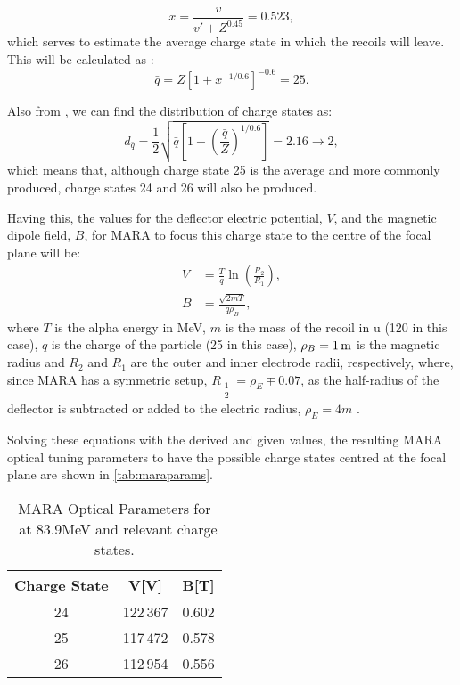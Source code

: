 \begin{equation}
    \label{eq:reduced}
    x = \frac{v}{v'+Z^{0.45}} = 0.523,
\end{equation}
which serves to estimate the average charge state in which the recoils will leave. This will be calculated as \cite{ND}:
\begin{equation}
    \label{eq:charge}
    \bar q = Z\left[1+ x^{-1/0.6}\right]^{-0.6} = 25.
\end{equation}

Also from \cite{ND}, we can find the distribution of charge states as:
\begin{equation}
    \label{eq:dist}
    d_{\bar q} = \frac{1}{2}\sqrt{\bar q \left[1-\left(\frac{\bar q}{Z}\right)^{1/0.6}\right]} = 2.16 \rightarrow 2,
\end{equation}
which means that, although charge state 25 is the average and more commonly produced, charge states 24 and 26 will also be produced.

Having this, the values for the deflector electric potential, $V$, and the magnetic dipole field, $B$, for MARA to focus this charge state to the centre of the focal plane will be:
\begin{align}
    V &= \frac{T}{q}\ln{\left(\frac{R_2}{R_1}\right)},    \label{eq:voltage}\\
    B &= \frac{\sqrt{2mT}}{q\rho_B},         \label{eq:magnetic}
\end{align}
where $T$ is the alpha energy in MeV, $m$ is the mass of the recoil in u (120 in this case), $q$ is the charge of the particle (25 in this case), $\rho_B = 1\,\text{m}$ is the magnetic radius and $R_2$ and $R_1$ are the outer and inner electrode radii, respectively, where, since MARA has a symmetric setup, $R_{\substack{1\\2}}  = \rho_E \mp 0.07$, as the half-radius of the deflector is subtracted or added to the electric radius, $\rho_E = 4\unit{m}$ \cite{saren}. 

Solving these equations with the derived and given values, the resulting MARA optical tuning parameters to have the possible charge states centred at the focal plane are shown in \autoref{tab:maraparams}. 

\begin{table}[H]
    \caption{MARA Optical Parameters for \la\ at 83.9\unit{MeV} and relevant charge states.}
    \label{tab:maraparams}
\begin{tabular}{ccc}
    \hline
    Charge State & V[V] & B[T]\\ \hline
    24 & 122\,367 & 0.602\\
    25 & 117\,472 & 0.578\\
    26 & 112\,954 & 0.556\\ \hline
\end{tabular}
\end{table}

